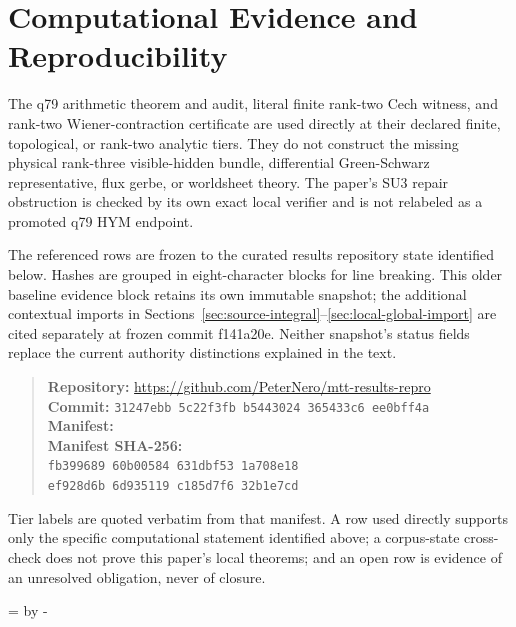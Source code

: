 \documentclass[11pt]{article}
\theoremstyle{definition}
\theoremstyle{remark}
\begin{document}


\section*{Computational Evidence and Reproducibility}
The q79 arithmetic theorem and audit, literal finite rank-two Cech witness, and rank-two Wiener-contraction certificate are used directly at their declared finite, topological, or rank-two analytic tiers. They do not construct the missing physical rank-three visible-hidden bundle, differential Green-Schwarz representative, flux gerbe, or worldsheet theory. The paper's SU3 repair obstruction is checked by its own exact local verifier and is not relabeled as a promoted q79 HYM endpoint.

The referenced rows are frozen to the curated results repository state identified below. Hashes are grouped in eight-character blocks for line breaking.
This older baseline evidence block retains its own immutable snapshot;
the additional contextual imports in Sections~\ref{sec:source-integral}--\ref{sec:local-global-import}
are cited separately at frozen commit f141a20e. Neither snapshot's status
fields replace the current authority distinctions explained in the text.
\begin{quote}\small
\textbf{Repository:} \url{https://github.com/PeterNero/mtt-results-repro}\\
\textbf{Commit:} \texttt{31247ebb 5c22f3fb b5443024 365433c6 ee0bff4a}\\
\textbf{Manifest:} \\
\textbf{Manifest SHA-256:}\\
\texttt{fb399689 60b00584 631dbf53 1a708e18}\\
\texttt{ef928d6b 6d935119 c185d7f6 32b1e7cd}
\end{quote}

Tier labels are quoted verbatim from that manifest. A row used directly supports only the specific computational statement identified above; a corpus-state cross-check does not prove this paper's local theorems; and an open row is evidence of an unresolved obligation, never of closure.

\par\begingroup{}=\pagegoal\advance{} by -\pagetotal\ifdim\dimen0<7\baselineskip\newpage\fi\endgroup
\end{document}
